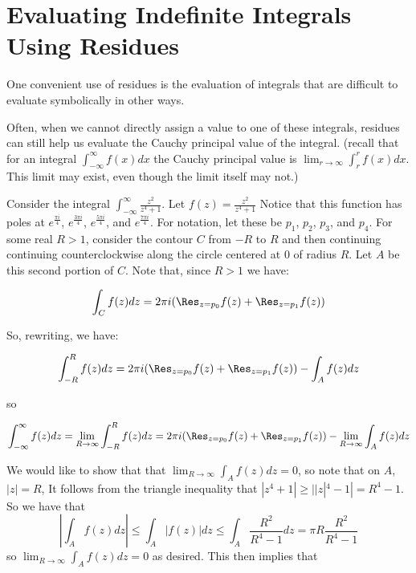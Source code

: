 \section*{Evaluating Indefinite Integrals Using Residues}

One convenient use of residues is the evaluation of integrals that are difficult to evaluate symbolically in other ways. 

Often, when we cannot directly assign a value to one of these integrals, residues can still help us evaluate the Cauchy principal value of the integral. (recall that for an integral $\int_{-\infty}^{\infty} f(x)dx$ the Cauchy principal value is $\lim_{r\to \infty} \int_{r}^{r} f(x) dx$. This limit may exist, even though the limit itself may not.)

Consider the integral $\int_{-\infty}^{\infty}\frac{z^2}{z^4+1}$. Let $f(z)=\frac{z^2}{z^4+1}$ Notice that this function has poles at $e^{\frac{\pi i}{4}}$, $e^{\frac{3\pi i}{4}}$, $e^{\frac{5\pi i}{4}}$, and $e^{\frac{7\pi i}{4}}$. For notation, let these be $p_1$, $p_2$, $p_3$, and $p_4$. For some real $R>1$, consider the contour $C$ from $-R$ to $R$ and then continuing continuing counterclockwise along the circle centered at $0$ of radius $R$. Let $A$ be this second portion of $C$. Note that, since $R>1$ we have:

\begin{equation*}
\int_C f(z)dz = 2\pi i (\Res_{z=p_0} f(z) +\Res_{z=p_1} f(z))
\end{equation*}

So, rewriting, we have:

\begin{equation*}
\int_{-R}^R f(z) dz = 2\pi i (\Res_{z=p_0} f(z) +\Res_{z=p_1} f(z)) - \int_A f(z) dz
\end{equation*}

so

\begin{equation*}
\int_{-\infty}^{\infty} f(z) dz = \lim_{R\to \infty} \int_{-R}^R f(z) dz = 2\pi i (\Res_{z=p_0} f(z) +\Res_{z=p_1} f(z)) - \lim_{R\to \infty} \int_A f(z) dz
\end{equation*}

We would like to show that that $\lim_{R\to\infty} \int_A f(z) dz = 0$, so note that on $A$, $|z|=R$, It follows from the triangle inequality that $|z^4+1|\geq ||z|^4-1| = R^4 -1$. So we have that 
$$|\int_A f(z) dz|\leq \int_A |f(z)| dz \leq \int_A \frac{R^2}{R^4 -1}dz = \pi R \frac{R^2}{R^4-1}$$
so $\lim_{R\to\infty} \int_A f(z) dz = 0$ as desired. This then implies that 


